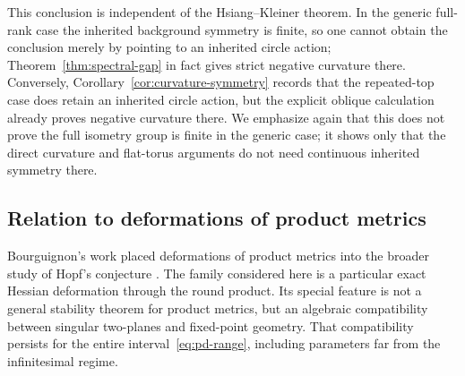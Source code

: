 \documentclass[11pt]{amsart}
\theoremstyle{definition}
\theoremstyle{remark}
\begin{document}
This conclusion is independent of the Hsiang--Kleiner theorem.  In the
generic full-rank case the inherited background symmetry is finite, so
one cannot obtain the conclusion merely by pointing to an inherited
circle action; Theorem~\ref{thm:spectral-gap} in fact gives strict
negative curvature there.  Conversely,
Corollary~\ref{cor:curvature-symmetry} records that the repeated-top
case does retain an inherited circle action, but the explicit oblique
calculation already proves negative curvature there.  We emphasize
again that this does not prove the full isometry group is finite in the
generic case; it shows only that the direct curvature and flat-torus
arguments do not need continuous inherited symmetry there.

\subsection{Relation to deformations of product metrics}

Bourguignon's work placed deformations of product metrics into the
broader study of Hopf's conjecture
\cite{Bourguignon1975,BourguignonDeschampsSentenac1973}.  The family
considered here is a particular exact Hessian deformation through the
round product.  Its special feature is not a general stability theorem
for product metrics, but an algebraic compatibility between singular
two-planes and fixed-point geometry.  That compatibility persists for
the entire interval~\eqref{eq:pd-range}, including parameters far from
the infinitesimal regime.
\end{document}
